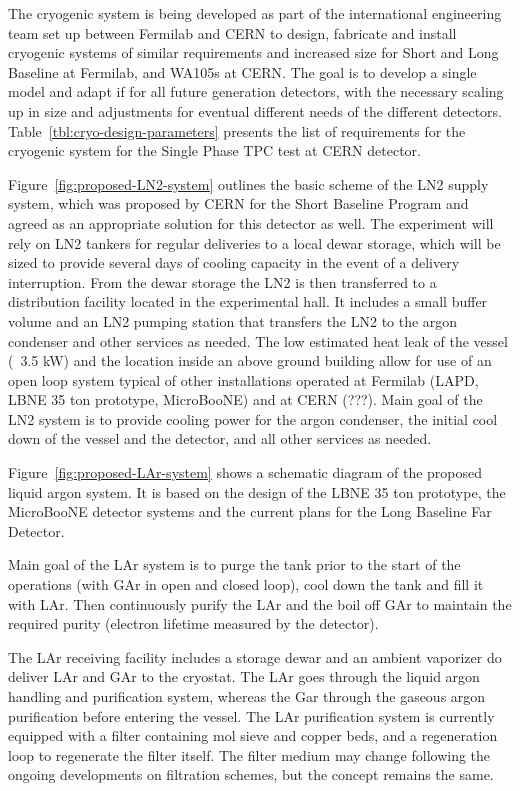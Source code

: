 The cryogenic system is being developed as part of the international engineering team set up between 
Fermilab and CERN to design, fabricate and install cryogenic systems of similar requirements and 
increased size for Short and Long Baseline at Fermilab, and WA105s at CERN. The goal is to develop a 
single model and adapt if for all future generation detectors, with the necessary scaling up in size and 
adjustments for eventual different needs of the different detectors. Table~\ref{tbl:cryo-design-parameters} presents the list of 
requirements for the cryogenic system for the Single Phase TPC test at CERN detector.

Figure~\ref{fig:proposed-LN2-system} outlines the basic scheme of the LN2 supply system, which was proposed by CERN for the Short 
Baseline Program and agreed as an appropriate solution for this detector as well. The experiment will rely 
on LN2 tankers for regular deliveries to a local dewar storage, which will be sized to provide several days 
of cooling capacity in the event of a delivery interruption. From the dewar storage the LN2 is then 
transferred to a distribution facility located in the experimental hall. It includes a small buffer volume and 
an LN2 pumping station that transfers the LN2 to the argon condenser and other services as needed. The 
low estimated heat leak of the vessel (~3.5 kW) and the location inside an above ground building allow for 
use of an open loop system typical of other installations operated at Fermilab (LAPD, LBNE 35 ton 
prototype, MicroBooNE) and at CERN (???). 
Main goal of the LN2 system is to provide cooling power for the argon condenser, the initial cool down of 
the vessel and the detector, and all other services as needed.

Figure~\ref{fig:proposed-LAr-system} shows a schematic diagram of the proposed liquid argon system. It is based on the design of the 
LBNE 35 ton prototype, the MicroBooNE detector systems and the current plans for the Long Baseline Far 
Detector.

Main goal of the LAr system is to purge the tank prior to the start of the operations (with GAr in open and 
closed loop), cool down the tank and fill it with LAr. Then continuously purify the LAr and the boil off GAr 
to maintain the required purity (electron lifetime measured by the detector).

The LAr receiving facility includes a storage dewar and an ambient vaporizer do deliver LAr and GAr to the 
cryostat. The LAr goes through the liquid argon handling and purification system, whereas the Gar through 
the gaseous argon purification before entering the vessel.
The LAr purification system is currently equipped with a filter containing mol sieve and copper beds, and a 
regeneration loop to regenerate the filter itself. The filter medium may change following the ongoing 
developments on filtration schemes, but the concept remains the same.

